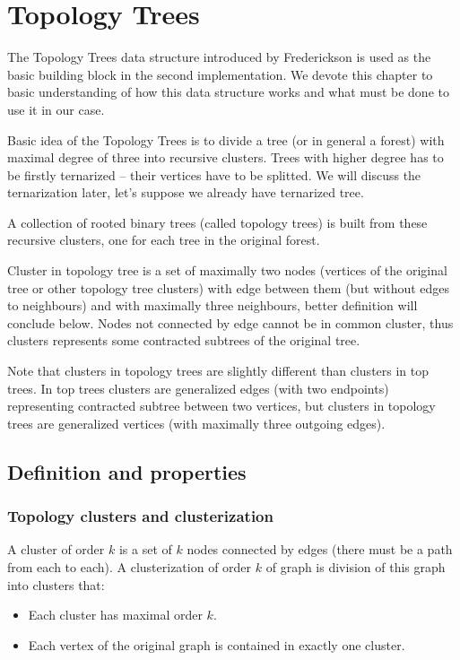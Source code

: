 \chapter{Topology Trees}
\label{chap:TopologyTrees}

The Topology Trees data structure introduced by Frederickson
\cite{DSforDynamicallyMaintainingRootedTrees} is used as the basic building
block in the second implementation. We devote this chapter to basic
understanding of how this data structure works and what must be done to use
it in our case.

Basic idea of the Topology Trees is to divide a tree (or in general a forest)
with maximal degree of three into recursive {\I clusters}. Trees with higher
degree has to be firstly {\I ternarized} -- their vertices have to be splitted.
We will discuss the ternarization later, let's suppose we already have
ternarized tree.

A collection of rooted binary trees (called {\I topology trees}) is built from
these recursive clusters, one for each tree in the original forest.

Cluster in topology tree is a set of maximally two nodes (vertices of the
original tree or other topology tree clusters) with edge between them (but
without edges to neighbours) and with maximally three neighbours, better
definition will conclude below. Nodes not connected by edge cannot be in common
cluster, thus clusters represents some contracted subtrees of the original tree.

Note that clusters in topology trees are slightly different than clusters in
top trees. In top trees clusters are generalized edges (with two endpoints)
representing contracted subtree between two vertices, but clusters in topology
trees are generalized vertices (with maximally three outgoing edges).

\section{Definition and properties}

\subsection{Topology clusters and clusterization}

A {\I cluster of order $k$} is a set of $k$ nodes connected by edges (there must
be a path from each to each). A {\I clusterization of order $k$} of graph is
division of this graph into clusters that:
\begin{itemize}
\item Each cluster has maximal order $k$.
\item Each vertex of the original graph is contained in exactly one cluster.
\end{itemize}

